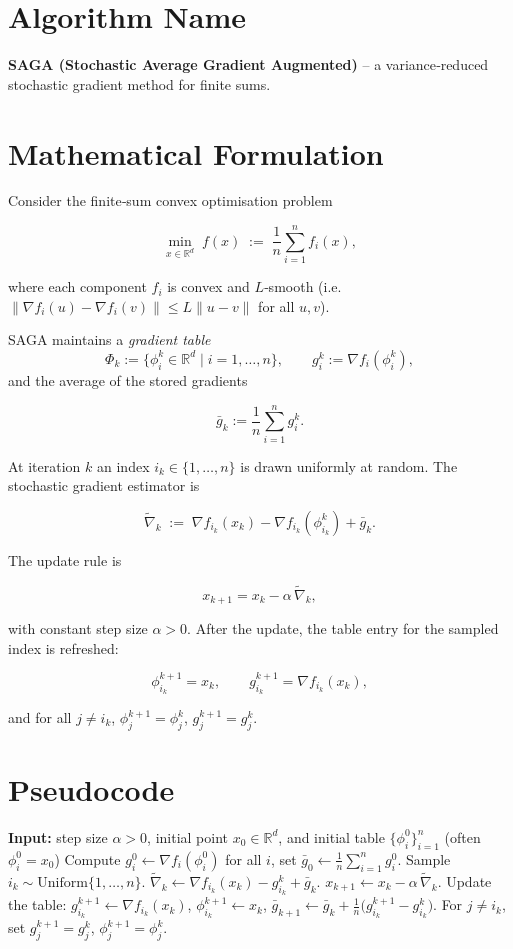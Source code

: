 \documentclass{article}
\newcommand{\R}{\mathbb{R}}
\newcommand{\grad}{\nabla}
\begin{document}
\section*{Algorithm Name}
\textbf{SAGA (Stochastic Average Gradient Augmented)} – a variance‑reduced stochastic gradient method for finite sums.

\section*{Mathematical Formulation}
Consider the finite‑sum convex optimisation problem  

\[
\min_{x\in\R^{d}} \; f(x)\;:=\;\frac{1}{n}\sum_{i=1}^{n} f_i(x),
\tag{1}
\]

where each component $f_i$ is convex and $L$‑smooth (i.e. $\|\grad f_i(u)-\grad f_i(v)\|\le L\|u-v\|$ for all $u,v$).

SAGA maintains a \emph{gradient table}
\[
\Phi_k:=\bigl\{\phi_i^k\in\R^{d}\;|\;i=1,\dots ,n\bigr\},
\qquad 
g_i^k:=\grad f_i(\phi_i^k),
\tag{2}
\]
and the average of the stored gradients  

\[
\bar g_k:=\frac{1}{n}\sum_{i=1}^{n} g_i^k .
\tag{3}
\]

At iteration $k$ an index $i_k\in\{1,\dots ,n\}$ is drawn uniformly at random.
The stochastic gradient estimator is  

\[
\tilde\nabla_k \;:=\; \grad f_{i_k}(x_k)-\grad f_{i_k}(\phi_{i_k}^k)+\bar g_k .
\tag{4}
\]

The update rule is  

\[
x_{k+1}=x_k-\alpha \,\tilde\nabla_k ,
\tag{5}
\]

with constant step size $\alpha>0$.  
After the update, the table entry for the sampled index is refreshed:

\[
\phi_{i_k}^{k+1}=x_k,\qquad 
g_{i_k}^{k+1}= \grad f_{i_k}(x_k),
\tag{6}
\]

and for all $j\neq i_k$, $\phi_{j}^{k+1}=\phi_{j}^{k}$, $g_{j}^{k+1}=g_{j}^{k}$.

\section*{Pseudocode}
\begin{algorithm}[H]
\caption{SAGA}
\begin{algorithmic}[1]
\State \textbf{Input:} step size $\alpha>0$, initial point $x_0\in\R^d$,
\State \hspace{1.2cm} and initial table $\{\phi_i^0\}_{i=1}^n$ (often $\phi_i^0=x_0$)
\State Compute $g_i^0\gets\grad f_i(\phi_i^0)$ for all $i$, set $\bar g_0\gets\frac1n\sum_{i=1}^n g_i^0$.
    \State Sample $i_k\sim\text{Uniform}\{1,\dots ,n\}$.
    \State $\tilde\nabla_k \gets \grad f_{i_k}(x_k)-g_{i_k}^k+\bar g_k$.
    \State $x_{k+1}\gets x_k-\alpha\,\tilde\nabla_k$.
    \State Update the table:
    \State\quad $g_{i_k}^{k+1}\gets \grad f_{i_k}(x_k)$,
    \State\quad $\phi_{i_k}^{k+1}\gets x_k$,
    \State\quad $\bar g_{k+1}\gets \bar g_k+\frac{1}{n}\bigl(g_{i_k}^{k+1}-g_{i_k}^{k}\bigr)$.
    \State For $j\neq i_k$, set $g_j^{k+1}=g_j^{k}$, $\phi_j^{k+1}=\phi_j^{k}$.
\EndFor
\end{algorithmic}
\end{algorithm}
\end{document}
